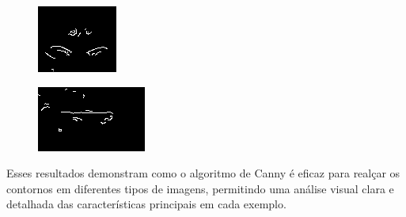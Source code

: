 \begin{figure}[h!]
    \vspace{1cm}

    \begin{minipage}[b]{0.45\textwidth}
        \centering
        \includegraphics[width=0.9\linewidth]{fig/03_nose_edge.png}
        \label{fig:canny-nariz}
    \end{minipage}
    \hfill
    \begin{minipage}[b]{0.45\textwidth}
        \centering
        \includegraphics[width=0.9\linewidth]{fig/03_mouth_edge.png}
        \label{fig:canny-boca}
    \end{minipage}
    \label{fig:canny-aplicacao}
\end{figure}
Esses resultados demonstram como o algoritmo de Canny é eficaz para realçar os contornos em diferentes tipos de imagens, permitindo uma análise visual clara e detalhada das características principais em cada exemplo.

